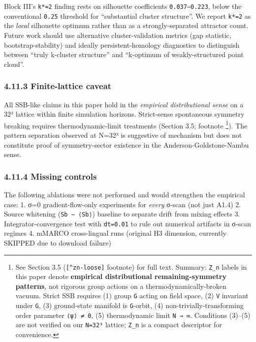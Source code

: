 \documentclass[
]{article}
\begin{document}
Block III's \texttt{k*=2} finding rests on silhouette coefficients
\texttt{0.037–0.223}, below the conventional \texttt{0.25} threshold for
``substantial cluster structure''. We report \texttt{k*=2} as the
\emph{local} silhouette optimum rather than as a strongly-separated
attractor count. Future work should use alternative cluster-validation
metrics (gap statistic, bootstrap-stability) and ideally
persistent-homology diagnostics to distinguish between ``truly k-cluster
structure'' and ``k-optimum of weakly-structured point cloud''.

\hypertarget{finite-lattice-caveat}{%
\subsubsection{4.11.3 Finite-lattice
caveat}\label{finite-lattice-caveat}}

All SSB-like claims in this paper hold in the \emph{empirical
distributional sense} on a 32³ lattice within finite simulation
horizons. Strict-sense spontaneous symmetry breaking requires
thermodynamic-limit treatments (Section 3.5; footnote \footnote{See
  Section 3.5 (\texttt{{[}\^{}zn-loose{]}} footnote) for full text.
  Summary: \texttt{Z\_n} labels in this paper denote \textbf{empirical
  distributional remaining-symmetry patterns}, not rigorous group
  actions on a thermodynamically-broken vacuum. Strict SSB requires (1)
  group \texttt{G} acting on field space, (2) \texttt{V} invariant under
  \texttt{G}, (3) ground-state manifold is \texttt{G}-orbit, (4)
  non-trivially-transforming order parameter \texttt{⟨ψ⟩\ ≠\ 0}, (5)
  thermodynamic limit \texttt{N\ →\ ∞}. Conditions (3)--(5) are not
  verified on our \texttt{N=32³} lattice; \texttt{Z\_n} is a compact
  descriptor for convenience.}). The pattern separation observed at
N=32³ is suggestive of mechanism but does not constitute proof of
symmetry-sector existence in the Anderson-Goldstone-Nambu sense.

\hypertarget{missing-controls}{%
\subsubsection{4.11.4 Missing controls}\label{missing-controls}}

The following ablations were not performed and would strengthen the
empirical case: 1. σ=0 gradient-flow-only experiments for \emph{every}
σ-scan (not just A1.4) 2. Source whitening (\texttt{Sb\ −\ ⟨Sb⟩})
baseline to separate drift from mixing effects 3. Integrator-convergence
test with \texttt{dt=0.01} to rule out numerical artifacts in σ-scan
regimes 4. mMARCO cross-lingual runs (original H3 dimension, currently
SKIPPED due to download failure)
\end{document}
